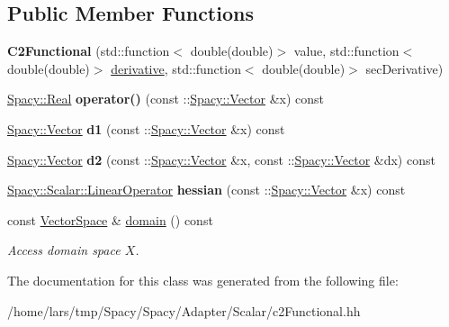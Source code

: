 \subsection*{Public Member Functions}
\begin{DoxyCompactItemize}
\item 
{\bfseries C2\+Functional} (std\+::function$<$ double(double)$>$ value, std\+::function$<$ double(double)$>$ \hyperlink{namespaceSpacy_a002fe344fa6d04a6ac59a74ea25fddb6}{derivative}, std\+::function$<$ double(double)$>$ sec\+Derivative)\hypertarget{classSpacy_1_1Scalar_1_1C2Functional_a6458c77ba0a55aace7bd3e739078b25b}{}\label{classSpacy_1_1Scalar_1_1C2Functional_a6458c77ba0a55aace7bd3e739078b25b}

\item 
\hyperlink{classSpacy_1_1Real}{Spacy\+::\+Real} {\bfseries operator()} (const \+::\hyperlink{classSpacy_1_1Vector}{Spacy\+::\+Vector} \&x) const \hypertarget{classSpacy_1_1Scalar_1_1C2Functional_a925d8325d3d58de9ccf82fb4c20a7f87}{}\label{classSpacy_1_1Scalar_1_1C2Functional_a925d8325d3d58de9ccf82fb4c20a7f87}

\item 
\hyperlink{classSpacy_1_1Vector}{Spacy\+::\+Vector} {\bfseries d1} (const \+::\hyperlink{classSpacy_1_1Vector}{Spacy\+::\+Vector} \&x) const \hypertarget{classSpacy_1_1Scalar_1_1C2Functional_ac6baf3f5a3e1fbb1a2dc8172b0d471d5}{}\label{classSpacy_1_1Scalar_1_1C2Functional_ac6baf3f5a3e1fbb1a2dc8172b0d471d5}

\item 
\hyperlink{classSpacy_1_1Vector}{Spacy\+::\+Vector} {\bfseries d2} (const \+::\hyperlink{classSpacy_1_1Vector}{Spacy\+::\+Vector} \&x, const \+::\hyperlink{classSpacy_1_1Vector}{Spacy\+::\+Vector} \&dx) const \hypertarget{classSpacy_1_1Scalar_1_1C2Functional_adcb4d9ed480a86199c82f1d1a97fe6dc}{}\label{classSpacy_1_1Scalar_1_1C2Functional_adcb4d9ed480a86199c82f1d1a97fe6dc}

\item 
\hyperlink{structSpacy_1_1Scalar_1_1LinearOperator}{Spacy\+::\+Scalar\+::\+Linear\+Operator} {\bfseries hessian} (const \+::\hyperlink{classSpacy_1_1Vector}{Spacy\+::\+Vector} \&x) const \hypertarget{classSpacy_1_1Scalar_1_1C2Functional_aee5a5f9a601aa339c67ec57e44806343}{}\label{classSpacy_1_1Scalar_1_1C2Functional_aee5a5f9a601aa339c67ec57e44806343}

\item 
const \hyperlink{classSpacy_1_1VectorSpace}{Vector\+Space} \& \hyperlink{classSpacy_1_1FunctionalBase_a2d3397deb9fa1ad85ed04e37a03b3aa6}{domain} () const \hypertarget{classSpacy_1_1FunctionalBase_a2d3397deb9fa1ad85ed04e37a03b3aa6}{}\label{classSpacy_1_1FunctionalBase_a2d3397deb9fa1ad85ed04e37a03b3aa6}

\begin{DoxyCompactList}\small\item\em Access domain space $X$. \end{DoxyCompactList}\end{DoxyCompactItemize}


The documentation for this class was generated from the following file\+:\begin{DoxyCompactItemize}
\item 
/home/lars/tmp/\+Spacy/\+Spacy/\+Adapter/\+Scalar/c2\+Functional.\+hh\end{DoxyCompactItemize}
